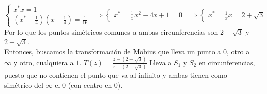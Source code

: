 {\[\begin{cases}
        x^* x = 1 \\
        (x^* - \frac{1}{4})(x - \frac{1}{4}) = \frac{1}{16}
    \end{cases}
    \implies
    \begin{cases}
    x^*=\frac{1}{x}
    x^2-4x+1=0
    \end{cases}
    \implies
    \begin{cases}
    x^*=\frac{1}{x}
    x=2 + \sqrt{3}
    \end{cases}
    \]  
    Por lo que los puntos simétricos comunes a ambas circunferencias son $2+\sqrt{3}$ y $2-\sqrt{3}$.
    \\  
    Entonces, buscamos la transformación de Möbius que lleva un punto a $0$, otro a $\infty$ y otro, cualquiera a $1$.
    $T(z)= \frac{z-(2+\sqrt{3})}{z-(2-\sqrt{3})}$
    Lleva a $S_1$ y $S_2$ en circunferencias, puesto que no contienen el punto que va al infinito y ambas tienen como simétrico del $\infty$ el $0$ (con centro en 0).
}

